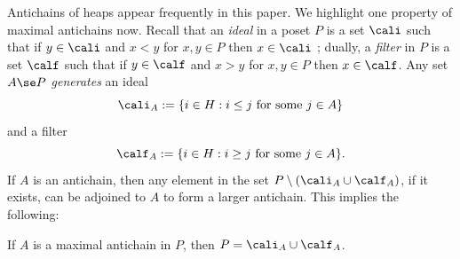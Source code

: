 Antichains of heaps appear frequently in this paper. We highlight one property of maximal antichains now. Recall
that an \emph{ideal} in a poset $P$ is a set $\cali$ such that if $y\in \cali$ and $x<y$ for $x,y\in P$ then $x\in
\cali$ ; dually, a \emph{filter} in $P$ is a set $\calf$ such that if $y\in \calf$ and $x>y$ for $x,y\in P$ then
$x\in \calf$. Any set $A\se P$ \emph{generates} an ideal 
\[ \cali_A:=\{i\in H:i\le j\text{ for some $j\in A$}\} \]
and a filter 
\[ \calf_A:=\{i\in H:i\ge j\text{ for some $j\in A$}\}.\] 
If $A$ is an antichain, then any element in the set $P\setminus (\cali_A\cup\calf_A)$, if it exists, can be
adjoined to $A$ to form a larger antichain. This implies the following:

\begin{lemma}
    \label{lemm:maxAntichain} If $A$ is a maximal antichain in $P$, then $P=\cali_A\cup \calf_A$.
\end{lemma}
